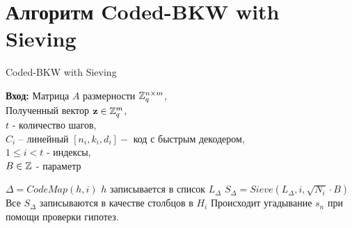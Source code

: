 \documentclass[a4paper,11pt]{article}
\begin{document}
\section{Алгоритм Coded-BKW with Sieving}

	
	
	\begin{algorithm}[ph]
		\caption{Coded-BKW with Sieving}
		\label{alg:AlgName}
		\textbf{Вход:}  Матрица $A$ размерности ${{\mathbb Z}}_q^{n \times m}$, \\
		Полученный вектор $\mathbf{z} \in {{\mathbb Z}}_q^m$, \\
		$t$ - количество шагов,\\
		$C_i$ -- линейный $ [n_i, k_i, d_i]-$ код с быстрым декодером,\\
		$1 \leq i < t$ - индексы,\\
		$B \in {{\mathbb Z}}$ - параметр \\
		
		\begin{algorithmic}[1]
			
					\State $\Delta=CodeMap(h,i)$
					\State $h$ записывается в список $L_{\Delta}$
				\EndFor
					\State $S_{\Delta} = Sieve(L_{\Delta}, i, \sqrt{N_i}\cdot B)$
					\State Все $S_{\Delta}$ записываются в качестве столбцов в $H_i$
				\EndFor
			\EndFor
			\State Происходит угадывание $s_n$ при помощи проверки гипотез.
		\end{algorithmic}
		
	\end{algorithm}
	
\end{document}
